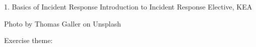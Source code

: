 \documentclass[Screen16to9,17pt]{foils}
\begin{document}
\mytitlepage
{1. Basics of Incident Response}
{Introduction to Incident Response Elective, KEA}




\begin{list2}
\item
\item
\item
\end{list2}

Photo by Thomas Galler on Unsplash


\begin{list2}
\item
\item
\item
\item
\item
\end{list2}

Exercise theme:
\begin{list2}
\item
\item
\item
\end{list2}


\end{document}

